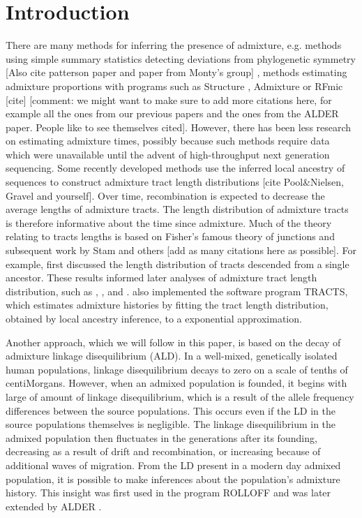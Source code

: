 \section*{Introduction}
There are many methods for inferring the presence of admixture, e.g. methods using simple summary statistics detecting deviations from phylogenetic symmetry \cite{reich2009reconstructing} [Also cite patterson paper and paper from Monty's group] , methods estimating admixture proportions with programs such as Structure \cite{pritchard2000inference},  Admixture \cite{alexander2009fast} or RFmic [cite] [comment: we might want to make sure to add more citations here, for example all the ones from our previous papers and the ones from the ALDER paper.  People like to see themselves cited]. However, there has been less research on estimating admixture times, possibly because such methods require data which were unavailable until the advent of high-throughput next generation sequencing. Some recently developed methods use the inferred local ancestry of sequences to construct admixture tract length distributions [cite Pool&Nielsen, Gravel and yourself]. Over time, recombination is expected to decrease the average lengths of admixture tracts. The length distribution of admixture tracts is therefore informative about the time since admixture.  Much of the theory relating to tracts lengths is based on Fisher's famous theory of junctions \cite{fisher1949theory} and subsequent work by Stam \cite{stam1980distribution} and others [add as many citations here as possible]. For example, \cite{baird2003distribution} first discussed the length distribution of tracts descended from a single ancestor. These results informed later analyses of admixture tract length distribution, such as \cite{pool2009inference}, \cite{gravel2012population}, and \cite{liang2014lengths}. \cite{gravel2012population} also implemented the software program TRACTS, which estimates admixture histories by fitting the tract length distribution, obtained by local ancestry inference, to a exponential approximation.

Another approach, which we will follow in this paper, is based on the decay of admixture linkage disequilibrium (ALD). In a well-mixed, genetically isolated human populations, linkage disequilibrium decays to zero on a scale of tenths of centiMorgans. However, when an admixed population is founded, it begins with large of amount of linkage disequilibrium, which is a result of the allele frequency differences between the source populations. This occurs even if the LD in the source populations themselves is negligible. The linkage disequilibrium in the admixed population then fluctuates in the generations after its founding, decreasing as a result of drift and recombination, or increasing because of additional waves of migration. From the LD present in a modern day admixed population, it is possible to make inferences about the population's admixture history. This insight was first used in the program ROLLOFF \cite{moorjani2011history} and was later extended by ALDER \cite{loh2013inferring}. 

